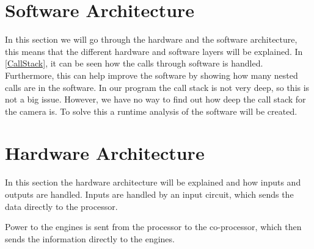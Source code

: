 \section{Software Architecture}

In this section we will go through the hardware and the software architecture,
this means that the different hardware and software layers will be explained. In
\autoref{CallStack}, it can be seen how the calls through software is handled.
Furthermore, this can help improve the software by showing how many nested calls
are in the software. In our program the call stack is not very deep, so this is
not a big issue. However, we have no way to find out how deep the call stack for
the camera is. To solve this a runtime analysis of the software will be created. 

\section{Hardware Architecture}

In this section the hardware architecture will be explained and how inputs and
outputs are handled. Inputs are handled by an input circuit, which sends the
data directly to the processor. \nl

Power to the engines is sent from the processor to the co-processor, which then
sends the information directly to the engines. 
